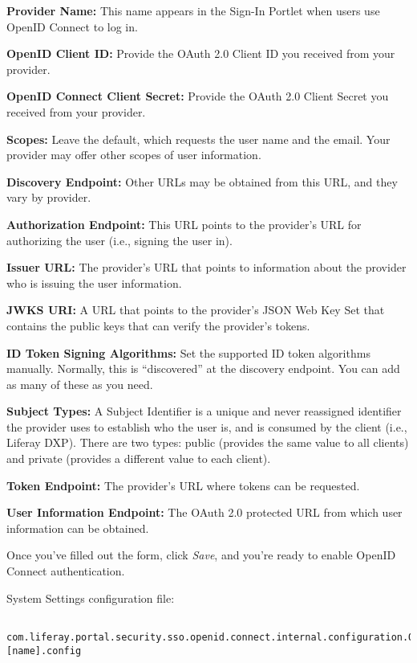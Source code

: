 \textbf{Provider Name:} This name appears in the Sign-In Portlet when
users use OpenID Connect to log in.

\textbf{OpenID Client ID:} Provide the OAuth 2.0 Client ID you received
from your provider.

\textbf{OpenID Connect Client Secret:} Provide the OAuth 2.0 Client
Secret you received from your provider.

\textbf{Scopes:} Leave the default, which requests the user name and the
email. Your provider may offer other scopes of user information.

\textbf{Discovery Endpoint:} Other URLs may be obtained from this URL,
and they vary by provider.

\textbf{Authorization Endpoint:} This URL points to the provider's URL
for authorizing the user (i.e., signing the user in).

\textbf{Issuer URL:} The provider's URL that points to information about
the provider who is issuing the user information.

\textbf{JWKS URI:} A URL that points to the provider's JSON Web Key Set
that contains the public keys that can verify the provider's tokens.

\textbf{ID Token Signing Algorithms:} Set the supported ID token
algorithms manually. Normally, this is ``discovered'' at the discovery
endpoint. You can add as many of these as you need.

\textbf{Subject Types:} A Subject Identifier is a unique and never
reassigned identifier the provider uses to establish who the user is,
and is consumed by the client (i.e., Liferay DXP). There are two types:
public (provides the same value to all clients) and private (provides a
different value to each client).

\textbf{Token Endpoint:} The provider's URL where tokens can be
requested.

\textbf{User Information Endpoint:} The OAuth 2.0 protected URL from
which user information can be obtained.

Once you've filled out the form, click \emph{Save}, and you're ready to
enable OpenID Connect authentication.

\noindent\hrulefill

System Settings configuration file:

\begin{verbatim}
 com.liferay.portal.security.sso.openid.connect.internal.configuration.OpenIdConnectProviderConfiguration-[name].config
\end{verbatim}

